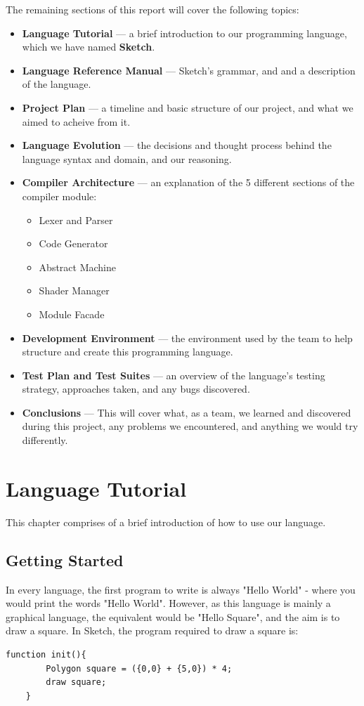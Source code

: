 \documentclass{l3proj}
\begin{document}
The remaining sections of this report will cover the following topics:
\begin{itemize}
	\item \textbf{Language Tutorial} --- a brief introduction to our programming language, which we have named \textbf{Sketch}.
	\item \textbf{Language Reference Manual} --- Sketch's grammar, and and a description of the language.
	\item \textbf{Project Plan} --- a timeline and basic structure of our project, and what we aimed to acheive from it.
	\item \textbf{Language Evolution} --- the decisions and thought process behind the language syntax and domain, and our reasoning.
	\item \textbf{Compiler Architecture} --- an explanation of the 5 different sections of the compiler module:
	\begin{itemize}
		\item Lexer and Parser
		\item Code Generator
		\item Abstract Machine
		\item Shader Manager
		\item Module Facade
	\end{itemize}
	\item \textbf{Development Environment} --- the environment used by the team to help structure and create this programming language.
	\item \textbf{Test Plan and Test Suites} --- an overview of the language's testing strategy, approaches taken, and any bugs discovered.
	\item \textbf{Conclusions} --- This will cover what, as a team, we learned and discovered during this project, any problems we encountered, and anything we would try differently.
\end{itemize}

\chapter{Language Tutorial}
\label{tut}
This chapter comprises of a brief introduction of how to use our language.
\section{Getting Started}
\label{start}
In every language, the first program to write is always "Hello World" - where you would print the words "Hello World". However, as this language is mainly a graphical language, the equivalent would be "Hello Square", and the aim is to draw a square. In Sketch, the program required to draw a square is:
\lstset{%
      basicstyle=\ttfamily\footnotesize\bfseries,
      xleftmargin=.1\textwidth, xrightmargin=.1\textwidth,
      captionpos=b,
      tabsize=4
    }
\begin{lstlisting}[caption={Hello Square},label={lst:tutorial-hello}]
    function init(){
        Polygon square = ({0,0} + {5,0}) * 4;
        draw square;
    }
\end{lstlisting}
\end{document}
